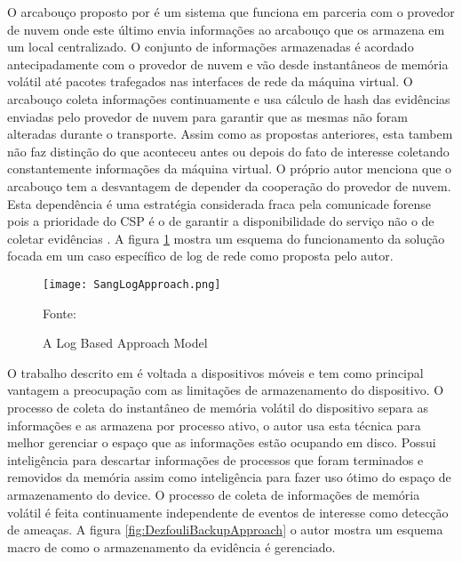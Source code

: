 O arcabouço proposto por \cite{SangLogApproach:2013} é um sistema que funciona em parceria com o provedor de nuvem onde este último envia informações ao arcabouço que os armazena em um local centralizado.
%
O conjunto de informações armazenadas é acordado antecipadamente com o provedor de nuvem e vão desde instantâneos de memória volátil até pacotes trafegados nas interfaces de rede da máquina virtual.
%
O arcabouço coleta informações continuamente e usa cálculo de hash das evidências enviadas pelo provedor de nuvem para garantir que as mesmas não foram alteradas durante o transporte.
%
Assim como as propostas anteriores, esta tambem não faz distinção do que aconteceu antes ou depois do fato de interesse coletando constantemente informações da máquina virtual.
%
O próprio autor menciona que o arcabouço tem a desvantagem de depender da cooperação do provedor de nuvem. Esta dependência é uma estratégia considerada fraca pela comunicade forense pois a prioridade do CSP é o de garantir a disponibilidade do serviço não o de coletar evidências \cite{ClarkeReviewOfChallenges2015}.
%
A figura \ref{fig:SangLogApproach} mostra um esquema do funcionamento da solução focada em um caso específico de log de rede como proposta pelo autor.

\begin{figure}[htb!]
\footnotesize
\caption{A Log Based Approach Model}
\texttt{[image: SangLogApproach.png]}
\centering
\label{fig:SangLogApproach}
\begin{center}
Fonte: \cite{SangLogApproach:2013} 
\end{center}
\end{figure}

O trabalho descrito em \cite{DezfouliBackupApproach:2012} é voltada a dispositivos móveis e tem como principal vantagem a preocupação com as limitações de armazenamento do dispositivo.
%
O processo de coleta do instantâneo de memória volátil do dispositivo separa as informações e as armazena por processo ativo, o autor usa esta técnica para melhor gerenciar o espaço que as informações estão ocupando em disco. 
%
Possui inteligência para descartar informações de processos que foram terminados e removidos da memória assim como inteligência para fazer uso ótimo do espaço de armazenamento do device.
%
O processo de coleta de informações de memória volátil é feita continuamente independente de eventos de interesse como detecção de ameaças.
%
A figura \ref{fig:DezfouliBackupApproach} o autor mostra um esquema macro de como o armazenamento da evidência é gerenciado.

